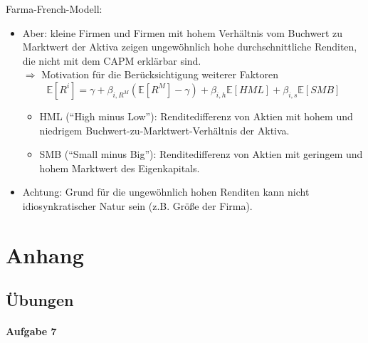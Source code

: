 \documentclass[12pt]{extreport} %
\theoremstyle{named}
\theoremstyle{nnamed}
\theoremstyle{itshape}
\theoremstyle{normal}
\begin{document}
Farma-French-Modell:

\begin{itemize}
	\item Aber: kleine Firmen und Firmen mit hohem Verhältnis vom Buchwert zu Marktwert der Aktiva zeigen ungewöhnlich hohe durchschnittliche Renditen, die nicht mit dem CAPM erklärbar sind. ~\\
		$\Rightarrow$ Motivation für die Berücksichtigung weiterer Faktoren
			$$ \mathbb{E} \left[ R^i \right] = \gamma + \beta_{i, R^M} \left( \mathbb{E} \left[ R^M \right] - \gamma \right) + \beta_{i,h} \mathbb{E} \left[ HML \right] + \beta_{i,s} \mathbb{E} \left[ SMB \right] $$
		\begin{itemize}
			\item HML (\enquote{High minus Low}): Renditedifferenz von Aktien mit hohem und niedrigem Buchwert-zu-Marktwert-Verhältnis der Aktiva.
			\item SMB (\enquote{Small minus Big}): Renditedifferenz von Aktien mit geringem und hohem Marktwert des Eigenkapitals.
		\end{itemize}
	\item Achtung: Grund für die ungewöhnlich hohen Renditen kann nicht idiosynkratischer Natur sein (z.B. Größe der Firma).
\end{itemize}


\chapter{Anhang}

\section*{Übungen}

\subsubsection*{Aufgabe 7}
\end{document}
